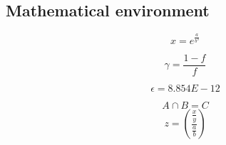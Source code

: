 \documentclass[14pt]{article}
\begin{document}
\subsection{Mathematical environment}
\begin{equation}
    x = e^{\frac{a}{b^3}}
\end{equation}

\begin{equation}
    \gamma = \frac{1-f}{f} 
\end{equation}

\begin{equation}
    \epsilon = 8.854E-12
\end{equation}

\begin{equation}
    A \cap B = C
\end{equation}
\begin{equation}
    z= \left(\frac{\frac{x}{y}}{\frac{a}{b}}\right)
\end{equation}
\end{document}
